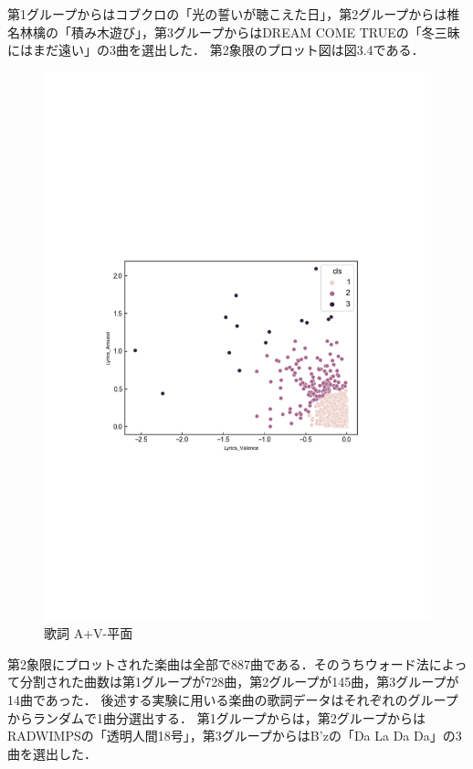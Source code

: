 第1グループからはコブクロの「光の誓いが聴こえた日」，第2グループからは椎名林檎の「積み木遊び」，第3グループからはDREAM COME TRUEの「冬三昧にはまだ遠い」の3曲を選出した．
\newpage
第2象限のプロット図は図3.4である．
\begin{figure}[H]
  \centering
  \includegraphics[width=14cm]{lyrics_A+V-.pdf}
  \vspace{-1mm}
  \caption{歌詞 A+V-平面}
  \label{fig:vkall}
  \vspace{5mm}
\end{figure}
第2象限にプロットされた楽曲は全部で887曲である．そのうちウォード法によって分割された曲数は第1グループが728曲，第2グループが145曲，第3グループが14曲であった．
後述する実験に用いる楽曲の歌詞データはそれぞれのグループからランダムで1曲分選出する．
第1グループからは，第2グループからはRADWIMPSの「透明人間18号」，第3グループからはB'zの「Da La Da Da」の3曲を選出した．
\newpage
